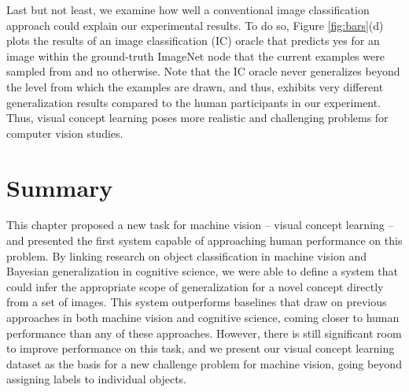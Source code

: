 Last but not least, we examine how well a conventional image classification approach could explain our experimental results. To do so, Figure \ref{fig:bars}(d) plots the results of an image classification (IC) oracle that predicts yes for an image within the ground-truth ImageNet node that the current examples were sampled from and no otherwise. Note that the IC oracle never generalizes beyond the level from which the examples are drawn, and thus, exhibits very different generalization results compared to the human participants in our experiment. Thus, visual concept learning poses more realistic and challenging problems for computer vision studies.

\section{Summary}

This chapter proposed a new task for machine vision -- visual
concept learning -- and presented the first system capable of approaching
human performance on this problem. By linking research on object
classification in machine vision and Bayesian generalization in cognitive
science, we were able to define a system that could infer the appropriate
scope of generalization for a novel concept directly from a set of
images. This system outperforms baselines that draw on previous approaches
in both machine vision and cognitive science, coming closer to human
performance than any of these approaches. However, there is still
significant room to improve performance on this task, and we present our
visual concept learning dataset as the basis for a new challenge problem
for machine vision, going beyond assigning labels to individual objects.
